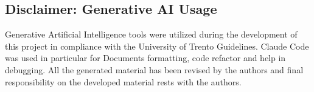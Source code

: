 \subsection*{Disclaimer: Generative AI Usage}

Generative Artificial Intelligence tools were utilized during the development of this project in
compliance with the University of Trento Guidelines. Claude Code was used in particular for Documents
formatting, code refactor and help in debugging. All the generated material has been revised by the
authors and final responsibility on the developed material rests with the authors.
